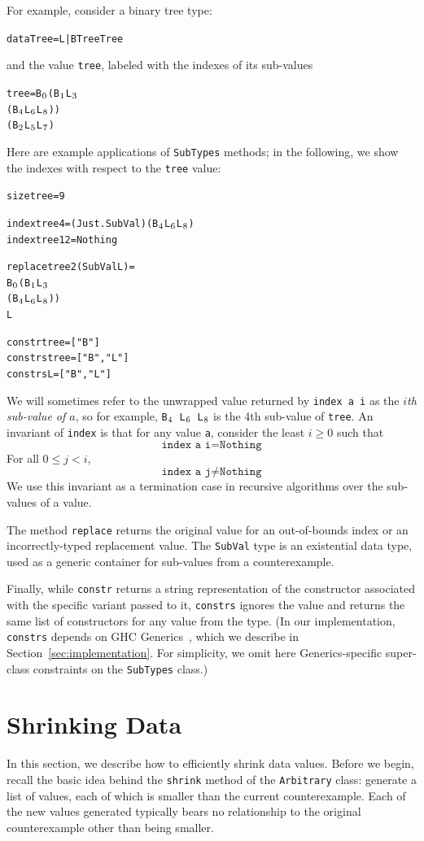 \documentclass[10pt]{sigplanconf}
\newenvironment{code}{\begin{alltt}}{\end{alltt}}
\newcommand{\ttp}[1]{\texttt{#1}}
\newcommand{\sub}[1]{\(\sb{#1}\)}
\begin{document}
For example, consider a binary tree type:
%
\begin{code}
data Tree = L | B Tree Tree
\end{code}
%
\noindent
and the value \ttp{tree}, labeled with the indexes of its sub-values
%
\begin{code}
tree = B\sub{0} (B\sub{1} L\sub{3}
             (B\sub{4} L\sub{6} L\sub{8}))
          (B\sub{2} L\sub{5} L\sub{7})
\end{code}
%
\noindent
Here are example applications of \ttp{SubTypes} methods; in the following, we
show the indexes with respect to the \ttp{tree} value:
%
\begin{code}
size tree = 9

index tree 4  = (Just . SubVal) (B\sub{4} L\sub{6} L\sub{8})
index tree 12 = Nothing

replace tree 2 (SubVal L) =
  B\sub{0} (B\sub{1} L\sub{3}
        (B\sub{4} L\sub{6} L\sub{8}))
     L

constr  tree = ["B"]
constrs tree = ["B", "L"]
constrs L    = ["B", "L"]
\end{code}
%
\noindent
We will sometimes refer to the unwrapped value returned by \ttp{index a i} as
the \emph{$i$th sub-value of $a$}, so for example, \ttp{B\sub{4} L\sub{6}
  L\sub{8}} is the 4th sub-value of \ttp{tree}.  An invariant of \ttp{index} is
that for any value \ttp{a}, consider the least $i \geq 0$ such that $$\ttp{index
  a i} = \ttp{Nothing}$$ For all $0 \leq j < i$, $$\ttp{index a j} \neq
\ttp{Nothing}$$ We use this invariant as a termination case in recursive
algorithms over the sub-values of a value.

The method \ttp{replace} returns the original value for an out-of-bounds index
or an incorrectly-typed replacement value.  The \ttp{SubVal} type is an
existential data type, used as a generic container for sub-values from a
counterexample.

Finally, while \ttp{constr} returns a string representation of the constructor
associated with the specific variant passed to it, \ttp{constrs} ignores the
value and returns the same list of constructors for any value from the type.
(In our implementation, \ttp{constrs} depends on GHC Generics~\cite{generics},
which we describe in Section~\ref{sec:implementation}.  For simplicity, we omit
here Generics-specific super-class constraints on the \ttp{SubTypes} class.)


\section{Shrinking Data}\label{sec:shrinking}
In this section, we describe how to efficiently shrink data values.  Before we
begin, recall the basic idea behind the \ttp{shrink} method of the
\ttp{Arbitrary} class: generate a list of values, each of which is smaller than
the current counterexample.  Each of the new values generated typically bears no
relationship to the original counterexample other than being smaller.
\end{document}
